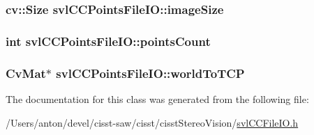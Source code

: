\subsubsection[{image\+Size}]{\setlength{\rightskip}{0pt plus 5cm}cv\+::\+Size svl\+C\+C\+Points\+File\+I\+O\+::image\+Size\hspace{0.3cm}{\ttfamily [protected]}}\label{classsvl_c_c_points_file_i_o_a4ffbc2aa614d24353a652b675652cde4}
\hypertarget{classsvl_c_c_points_file_i_o_a60697899d8fa6bd4e3be94daae5af43b}{}
\subsubsection[{points\+Count}]{\setlength{\rightskip}{0pt plus 5cm}int svl\+C\+C\+Points\+File\+I\+O\+::points\+Count\hspace{0.3cm}{\ttfamily [protected]}}\label{classsvl_c_c_points_file_i_o_a60697899d8fa6bd4e3be94daae5af43b}
\hypertarget{classsvl_c_c_points_file_i_o_a8fae958b1268f3d9d0719f8187043f2d}{}
\subsubsection[{world\+To\+T\+C\+P}]{\setlength{\rightskip}{0pt plus 5cm}Cv\+Mat$\ast$ svl\+C\+C\+Points\+File\+I\+O\+::world\+To\+T\+C\+P}\label{classsvl_c_c_points_file_i_o_a8fae958b1268f3d9d0719f8187043f2d}


The documentation for this class was generated from the following file\+:\begin{DoxyCompactItemize}
\item 
/\+Users/anton/devel/cisst-\/saw/cisst/cisst\+Stereo\+Vision/\hyperlink{svl_c_c_file_i_o_8h}{svl\+C\+C\+File\+I\+O.\+h}\end{DoxyCompactItemize}
